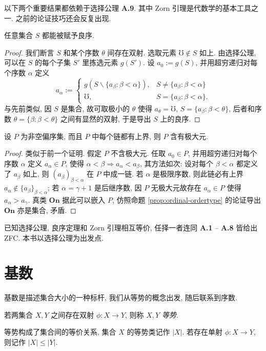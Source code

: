 以下两个重要结果都依赖于选择公理 \textbf{A.9}. 其中 Zorn 引理是代数学的基本工具之一. 之前的论证技巧还会反复出现.
\begin{theorem}\label{prop:wellorder-principle}
	任意集合 $S$ 都能被赋予良序.
\end{theorem}
\begin{proof}
	我们断言 $S$ 和某个序数 $\theta$ 间存在双射. 选取元素 $\mho \notin S$ 如上. 由选择公理, 可以在 $S$ 的每个子集 $S'$ 里拣选元素 $g(S')$. 设 $a_0 := g(S)$, 并用超穷递归对每个序数 $\alpha$ 定义
	\[ a_\alpha := \begin{cases}
		g \left( S \smallsetminus \{ a_\beta : \beta < \alpha \} \right), & S \neq \{ a_\beta : \beta < \alpha \} \\
		\mho, & S = \{ a_\beta : \beta < \alpha \}.
	\end{cases}\]
	与先前类似, 因 $S$ 是集合, 故可取极小的 $\theta$ 使得 $a_\theta = \mho$, $S = \{a_\beta: \beta < \theta\}$, 后者和序数 $\theta = \{\beta : \beta < \theta \}$ 之间有显然的双射, 于是导出 $S$ 上的良序.
\end{proof}

\begin{theorem}[Zorn 引理]\label{prop:Zorn}
	设 $P$ 为非空偏序集, 而且 $P$ 中每个链都有上界, 则 $P$ 含有极大元.
\end{theorem}
\begin{proof}
	类似于前一个证明. 假定 $P$ 不含极大元. 任取 $a_0 \in P$, 并用超穷递归对每个序数 $\alpha$ 定义 $a_\alpha \in P$, 使得 $\alpha < \beta \Rightarrow a_\alpha < a_\beta$, 其方法如次: 设对每个 $\beta < \alpha$ 都定义了 $a_\beta$ 如上, 则 $(a_\beta)_{\beta < \alpha}$ 在 $P$ 中成一链. 若 $\alpha$ 是极限序数, 则此链必有上界 $a_\alpha \notin \{ a_\beta \}_{\beta < \alpha}$; 若 $\alpha = \gamma + 1$ 是后继序数, 因 $P$ 无极大元故存在 $a_\alpha \in P$ 使得 $a_\alpha > a_\gamma$. 真类 $\textbf{On}$ 据此可以嵌入 $P$, 仿照命题 \ref{prop:ordinal-ordertype} 的论证导出 $\textbf{On}$ 亦是集合, 矛盾.
\end{proof}
已知选择公理, 良序定理和 Zorn 引理相互等价, 任择一者连同 \textbf{A.1} -- \textbf{A.8} 皆给出 ZFC. 本书以选择公理为出发点.

\section{基数}\label{sec:cardinal-number}
基数是描述集合大小的一种标杆, 我们从等势的概念出发, 随后联系到序数.

\begin{definition}
	若两集合 $X, Y$ 之间存在双射 $\phi: X \to Y$, 则称 $X, Y$ \emph{等势}.

	等势构成了集合间的等价关系, 集合 $X$ 的等势类记作 $|X|$. 若存在单射 $\phi: X \to Y$, 则记作 $|X| \leq |Y|$.
\end{definition}

